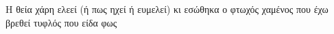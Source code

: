 Η θεία χάρη
ελεεί (ή πως ηχεί ή ευμελεί)
κι εσώθηκα ο φτωχός
χαμένος που έχω βρεθεί
τυφλός που είδα φως 
